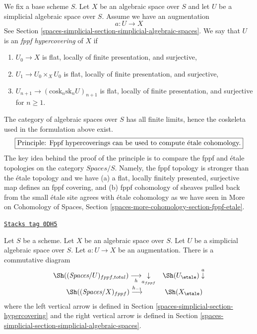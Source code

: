 \medskip\noindent
We fix a base scheme $S$.
Let $X$ be an algebraic space over $S$ and let $U$ be a simplicial
algebraic space over $S$. Assume we have an augmentation
$$
a : U \to X
$$
See Section \ref{spaces-simplicial-section-simplicial-algebraic-spaces}.
We say that $U$ is an {\it fppf hypercovering} of $X$ if
\begin{enumerate}
\item $U_0 \to X$ is flat, locally of finite presentation, and surjective,
\item $U_1 \to U_0 \times_X U_0$ is flat, locally of finite presentation, and
surjective,
\item $U_{n + 1} \to (\text{cosk}_n\text{sk}_n U)_{n + 1}$
is flat, locally of finite presentation, and surjective for $n \geq 1$.
\end{enumerate}
The category of algebraic spaces over $S$ has all finite limits, hence the
coskeleta used in the formulation above exist.
$$
\fbox{Principle: Fppf hypercoverings can be used to compute \'etale cohomology.}
$$
The key idea behind the proof of the principle is to compare the
fppf and \'etale topologies on the category $\textit{Spaces}/S$.
Namely, the fppf topology is stronger than the \'etale topology and we have
(a) a flat, locally finitely presented, surjective map defines
an fppf covering, and
(b) fppf cohomology of sheaves pulled back from the small \'etale site
agrees with \'etale cohomology as we have seen in
More on Cohomology of Spaces, Section
\ref{spaces-more-cohomology-section-fppf-etale}.

\begin{lemma}
\label{spaces-simplicial-lemma-compare-simplicial-objects-fppf-etale}
\href{https://stacks.math.columbia.edu/tag/0DH5}{\texttt{Stacks tag 0DH5}}

Let $S$ be a scheme. Let $X$ be an algebraic space over $S$.
Let $U$ be a simplicial algebraic space over $S$.
Let $a : U \to X$ be an augmentation. There is a commutative diagram
$$
\begin{array}{cc}\Sh((\textit{Spaces}/U)_{fppf, total}) \underset{h}{\longrightarrow}\underset{a_{fppf}}{\downarrow} & \Sh(U_\etale) \overset{a}{\downarrow} \\ \Sh((\textit{Spaces}/X)_{fppf}) \overset{h_{-1}}{\longrightarrow} & \Sh(X_\etale)\end{array}
$$
where the left vertical arrow is defined in
Section \ref{spaces-simplicial-section-hypercovering}
and the right vertical arrow is defined in
Section \ref{spaces-simplicial-section-simplicial-algebraic-spaces}.
\end{lemma}


